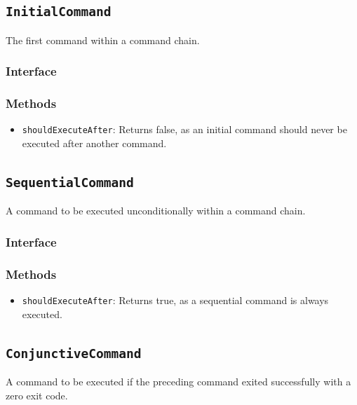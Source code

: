 \documentclass{article}
\begin{document}
  \subsection{\texttt{InitialCommand}}

  The first command within a command chain.

  \subsubsection{Interface}
  

  \subsubsection{Methods}
  \begin{itemize}
    \item \texttt{shouldExecuteAfter}: Returns false, as an initial
      command should never be executed after another command.
  \end{itemize}

  \subsection{\texttt{SequentialCommand}}

  A command to be executed unconditionally within a command chain.

  \subsubsection{Interface}
  

  \subsubsection{Methods}
  \begin{itemize}
    \item \texttt{shouldExecuteAfter}: Returns true, as a sequential
      command is always executed.
  \end{itemize}

  \subsection{\texttt{ConjunctiveCommand}}

  A command to be executed if the preceding command exited successfully
  with a zero exit code.
\end{document}

